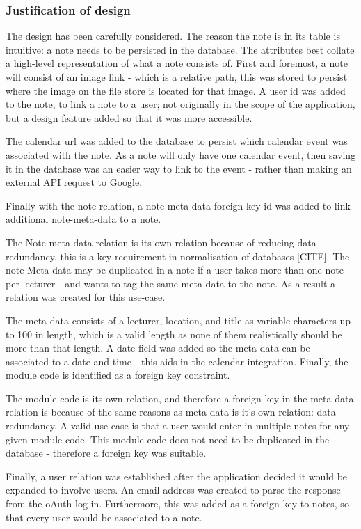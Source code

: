 \subsubsection{Justification of design}
The design has been carefully considered. The reason the note is in its table is intuitive: a note needs to be persisted in the database. The attributes best collate a high-level representation of what a note consists of. First and foremost,  a note will consist of an image link - which is a relative path, this was stored to persist where the image on the file store is located for that image. A user id was added to the note, to link a note to a user; not originally in the scope of the application, but a design feature added so that it was more accessible.

The calendar url was added to the database to persist which calendar event was associated with the note. As a note will only have one calendar event, then saving it in the database was an easier way to link to the event - rather than making an external API request to Google.

Finally with the note relation, a note-meta-data foreign key id was added to link additional note-meta-data to a note.

The Note-meta data relation is its own relation because of reducing data-redundancy, this is a key requirement in normalisation of databases [CITE]. The note Meta-data may be duplicated in a note if a user takes more than one note per lecturer - and wants to tag the same meta-data to the note. As a result a relation was created for this use-case.

The meta-data consists of a lecturer, location, and title as variable characters up to 100 in length, which is a valid length as none of them realistically should be more than that length. A date field was added so the meta-data can be associated to a date and time - this aids in the calendar integration. Finally, the module code is identified as a foreign key constraint.

The module code is its own relation, and therefore a foreign key in the meta-data relation is because of the same reasons as meta-data is it's own relation: data redundancy. A valid use-case is that a user would enter in multiple notes for any given module code. This module code does not need to be duplicated in the database - therefore a foreign key was suitable.

Finally, a user relation was established after the application decided it would be expanded to involve users. An email address was created to parse the response from the oAuth log-in. Furthermore, this was added as a foreign key to notes, so that every user would be associated to a note.

